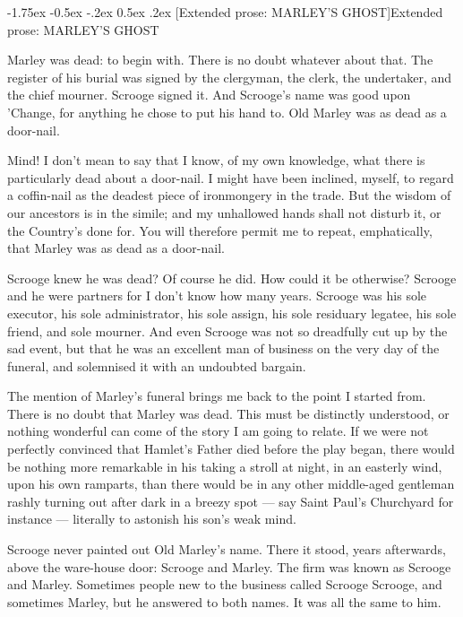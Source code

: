 \documentclass[11pt,twoside]{article}\makeatletter
\makeatletter
\renewcommand\section{\@startsection {section}{1}{\z@}%
     {-1.75ex \@plus -0.5ex \@minus -.2ex}%
     {0.5ex \@plus .2ex}%
     {\reset@font\Large\bfseries\sffamily}}
\makeatother
\begin{document}
\section[Extended prose: MARLEY'S GHOST]{Extended prose: MARLEY'S GHOST}\label{S1}%
\par
Marley was dead: to begin with. There is no doubt whatever about that. The register of his burial was signed by the clergyman, the clerk, the undertaker, and the chief mourner. Scrooge signed it. And Scrooge's name was good upon 'Change, for anything he chose to put his hand to. Old Marley was as dead as a door-nail. \par
Mind! I don't mean to say that I know, of my own knowledge, what there is particularly dead about a door-nail. I might have been inclined, myself, to regard a coffin-nail as the deadest piece of ironmongery in the trade. But the wisdom of our ancestors is in the simile; and my unhallowed  hands shall not disturb it, or the Country's done for. You will therefore permit me to repeat, emphatically, that Marley was as dead as a door-nail.\par
Scrooge knew he was dead? Of course he did. How could it be otherwise? Scrooge and he were partners for I don't know how many years. Scrooge was his sole executor, his sole administrator, his sole assign, his sole residuary legatee, his sole friend, and sole mourner. And even Scrooge was not so dreadfully cut up by the sad event, but that he was an excellent man of business on the very day of the funeral, and solemnised it with an undoubted bargain. \par
The mention of Marley's funeral brings me back to the point I started from. There is no doubt that Marley was dead. This must be distinctly understood, or nothing wonderful can come of the story I am going to relate. If we were not perfectly convinced that Hamlet's Father died before the play began, there would be nothing more remarkable in his taking a stroll at night, in an easterly wind, upon his own ramparts, than there  would be in any other middle-aged gentleman rashly turning out after dark in a breezy spot — say Saint Paul's Churchyard for instance — literally to astonish his son's weak mind.\par
Scrooge never painted out Old Marley's name. There it stood, years afterwards, above the ware-house door: Scrooge and Marley. The firm was known as Scrooge and Marley. Sometimes people new to the business called Scrooge Scrooge, and sometimes Marley, but he answered to both names. It was all the same to him. \par
\end{document}
